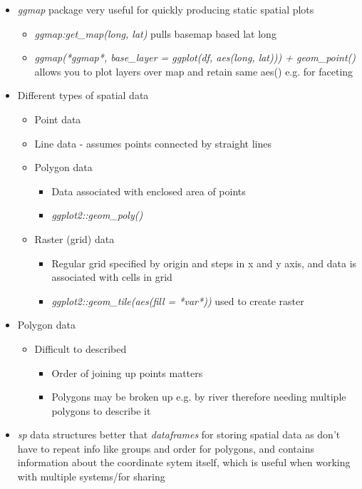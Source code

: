\documentclass{article}
\begin{document}
\begin{itemize}
    \item \textit{ggmap} package very useful for quickly producing static spatial plots
    \begin{itemize}
        \item \textit{ggmap:get\_map(long, lat)} pulls basemap based lat long
        \item \textit{ggmap(*ggmap*, base\_layer = ggplot(df, aes(long, lat))) + geom\_point()} allows you to plot layers over map and retain same aes() e.g. for faceting
    \end{itemize}
    \item Different types of spatial data
    \begin{itemize}
        \item Point data
        \item Line data - assumes points connected by straight lines
        \item Polygon data
        \begin{itemize}
            \item Data associated with enclosed area of points
            \item \textit{ggplot2::geom\_poly()}
        \end{itemize} 
        \item Raster (grid) data
        \begin{itemize}
            \item Regular grid specified by origin and steps in x and y axis, and data is associated with cells in grid
            \item \textit{ggplot2::geom\_tile(aes(fill = *var*))} used to create raster
        \end{itemize}
    \end{itemize}
    \item Polygon data
    \begin{itemize}
        \item Difficult to described
        \begin{itemize}
            \item Order of joining up points matters
            \item Polygons may be broken up e.g. by river therefore needing multiple polygons to describe it
        \end{itemize}
    \end{itemize}
    \item \textit{sp} data structures better that \textit{dataframes} for storing spatial data as don't have to repeat info like groups and order for polygons, and contains information about the coordinate sytem itself, which is useful when working with multiple systems/for sharing

\end{itemize}
\end{document}
